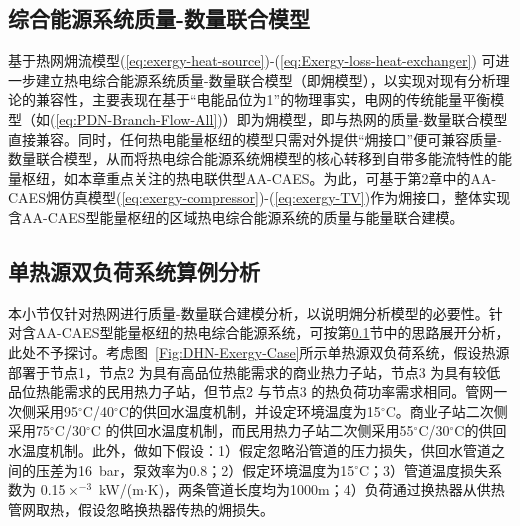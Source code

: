 \subsection{综合能源系统质量-数量联合模型}
\label{sec:exergy-IES-Interface}
基于热网㶲流模型(\ref{eq:exergy-heat-source})-(\ref{eq:Exergy-loss-heat-exchanger}) 可进一步建立热电综合能源系统质量-数量联合模型（即㶲模型），以实现对现有分析理论的兼容性，主要表现在基于“电能品位为1”的物理事实，电网的传统能量平衡模型（如(\ref{eq:PDN-Branch-Flow-All})）即为㶲模型，即与热网的质量-数量联合模型直接兼容。同时，任何热电能量枢纽的模型只需对外提供“㶲接口”便可兼容质量-数量联合模型，从而将热电综合能源系统㶲模型的核心转移到自带多能流特性的能量枢纽，如本章重点关注的热电联供型AA-CAES。为此，可基于第2章中的AA-CAES㶲仿真模型(\ref{eq:exergy-compressor})-(\ref{eq:exergy-TV})作为㶲接口，整体实现含AA-CAES型能量枢纽的区域热电综合能源系统的质量与能量联合建模。

\subsection{单热源双负荷系统算例分析}
本小节仅针对热网进行质量-数量联合建模分析，以说明㶲分析模型的必要性。针对含AA-CAES型能量枢纽的热电综合能源系统，可按第\ref{sec:exergy-IES-Interface}节中的思路展开分析，此处不予探讨。考虑图~\ref{Fig:DHN-Exergy-Case}所示单热源双负荷系统，假设热源部署于节点1，节点2 为具有高品位热能需求的商业热力子站，节点3 为具有较低品位热能需求的民用热力子站，但节点2 与节点3 的热负荷功率需求相同。管网一次侧采用95$^{\circ}$C/40$^{\circ}$C的供回水温度机制，并设定环境温度为15$^{\circ}$C。商业子站二次侧采用75$^{\circ}$C/30$^{\circ}$C 的供回水温度机制，而民用热力子站二次侧采用55$^{\circ}$C/30$^{\circ}$C的供回水温度机制。此外，做如下假设：1）假定忽略沿管道的压力损失，供回水管道之间的压差为16~bar，泵效率为0.8；2）假定环境温度为15$^{\circ}$C；3）管道温度损失系数为 0.15$\times ^{-3}$ kW/(m$\cdot$K)，两条管道长度均为1000m；4）负荷通过换热器从供热管网取热，假设忽略换热器传热的㶲损失。

